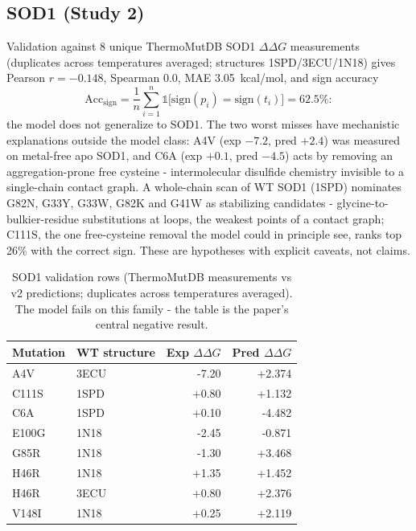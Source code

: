 \documentclass[11pt]{article}
\begin{document}
\subsection{SOD1 (Study 2)}
\label{sec:sod1}
Validation against 8 unique ThermoMutDB SOD1 $\Delta\Delta G$
measurements (duplicates across temperatures averaged; structures
1SPD/3ECU/1N18) gives Pearson $r=-0.148$, Spearman $0.0$, MAE
3.05~kcal/mol, and sign accuracy
\begin{equation}
\mathrm{Acc}_{\mathrm{sign}} = \frac{1}{n}\sum_{i=1}^{n}\mathbb{1}\!\big[\mathrm{sign}(p_i)=\mathrm{sign}(t_i)\big] = 62.5\%:
\label{eq:signacc}
\end{equation}
the model does not generalize to SOD1. The two worst misses have mechanistic explanations outside the
model class: A4V (exp $-7.2$, pred $+2.4$) was measured on metal-free
apo SOD1, and C6A (exp $+0.1$, pred $-4.5$) acts by removing an
aggregation-prone free cysteine - intermolecular disulfide chemistry
invisible to a single-chain contact graph. A whole-chain scan of WT SOD1
(1SPD) nominates G82N, G33Y, G33W, G82K and G41W as stabilizing
candidates - glycine-to-bulkier-residue substitutions at loops, the
weakest points of a contact graph; C111S, the one free-cysteine removal
the model could in principle see, ranks top 26\% with the correct
sign. These are hypotheses with explicit
caveats, not claims.

\begin{table}[ht]
\centering
\caption{SOD1 validation rows (ThermoMutDB measurements vs v2
predictions; duplicates across temperatures averaged). The model fails
on this family - the table is the paper's central negative result.}
\label{tab:sod1}
\begin{tabular}{l l r r}
\hline
Mutation & WT structure & Exp $\Delta\Delta G$ & Pred $\Delta\Delta G$ \\ \hline
A4V & 3ECU & -7.20 & +2.374 \\
C111S & 1SPD & +0.80 & +1.132 \\
C6A & 1SPD & +0.10 & -4.482 \\
E100G & 1N18 & -2.45 & -0.871 \\
G85R & 1N18 & -1.30 & +3.468 \\
H46R & 1N18 & +1.35 & +1.452 \\
H46R & 3ECU & +0.80 & +2.376 \\
V148I & 1N18 & +0.25 & +2.119 \\
\hline
\end{tabular}
\end{table}
\end{document}
